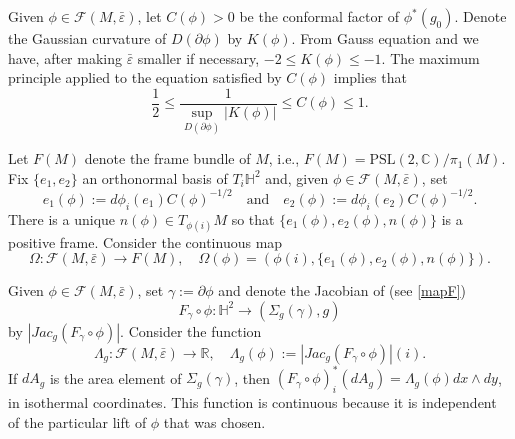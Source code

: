 \documentclass[11pt]{amsart}
\def\R{\mathbb R}
\def\H{\mathbb H}
\def\C{\mathbb C}
\theoremstyle{remark}
\theoremstyle{definition}
\begin{document}
{{	
	Given $\phi\in \mathcal F(M,\bar\varepsilon)$, let $C(\phi)> 0$ be the conformal factor of $\phi^*(g_0)$. Denote the Gaussian curvature of $D(\partial \phi)$ by $K(\phi)$. From Gauss equation {and \cite{seppi} we have, after making $\bar \varepsilon$ smaller if necessary, $-2\leq K(\phi)\leq -1$.} The maximum principle  applied to the equation satisfied by $C(\phi)$ implies that
	\begin{equation}\label{gauss.phi}
		\frac{1}{2}\leq \frac{1}{\sup_{D(\partial\phi)} |K(\phi)|}\leq C(\phi)\leq 1.
	\end{equation}
	
	
	
	Let $F(M)$ denote the frame bundle of $M$, i.e., $F(M)= \text{PSL}(2,\C)/ \pi_1(M)$. Fix $\{e_1,e_2\}$ an orthonormal basis of ${T_i}\H^2$ and, given $\phi\in  \mathcal F(M,\bar\varepsilon)$, set
	$$e_1(\phi):=d\phi_i(e_1)C(\phi)^{-1/2}\quad\text{and}\quad e_2(\phi):=d\phi_i(e_2)C(\phi)^{-1/2}.$$
	There  is a unique $n(\phi)\in T_{\phi(i)}M$ so that $\{e_1(\phi),e_2(\phi),n(\phi)\}$ is a positive frame.
	Consider the {continuous} map
	\begin{equation}\label{omega.map}
		\Omega: \mathcal F(M,\bar\varepsilon)\rightarrow F(M),\quad \Omega(\phi)=(\phi(i),\{e_1(\phi),e_2(\phi),n(\phi)\}).
	\end{equation}
	
	
	
	
	
	Given $\phi\in \mathcal F(M,\bar\varepsilon)$,  set $\gamma:=\partial \phi$ and denote the Jacobian of  (see \eqref{mapF})
	$$F_{\gamma}\circ \phi:\H^2\rightarrow (\Sigma_{g}(\gamma),g)$$ by $|Jac_g(F_{\gamma}\circ \phi)|$. Consider the  function
	\begin{equation}\label{jac.fcn}
		\Lambda_g: \mathcal F(M,\bar\varepsilon)\rightarrow \R, \quad \Lambda_g(\phi):=|Jac_g(F_{\gamma}\circ \phi)|(i).
	\end{equation}
	If $dA_g$ is the area element of $\Sigma_{g}(\gamma)$, then $(F_{\gamma}\circ\phi)_i^*(dA_g)= \Lambda_g(\phi)dx\wedge dy$, in isothermal coordinates. This function is continuous because it is independent of the particular lift of $\phi$ that was chosen.
	
}}
\end{document}

